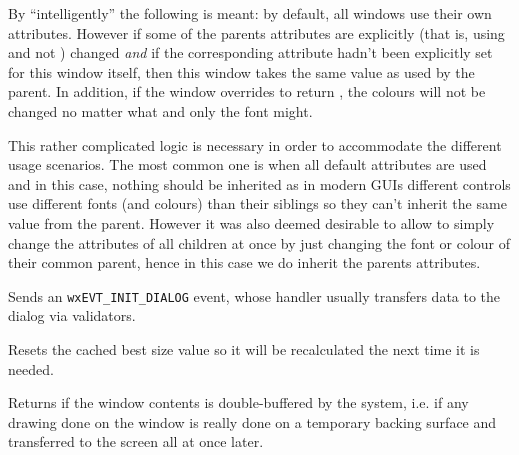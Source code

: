 By ``intelligently'' the following is meant: by default, all windows use their
own  attributes. However
if some of the parents attributes are explicitly (that is, using
 and not
) changed \emph{and} if the
corresponding attribute hadn't been explicitly set for this window itself,
then this window takes the same value as used by the parent. In addition, if
the window overrides 
to return \false, the colours will not be changed no matter what and only the
font might.

This rather complicated logic is necessary in order to accommodate the
different usage scenarios. The most common one is when all default attributes
are used and in this case, nothing should be inherited as in modern GUIs
different controls use different fonts (and colours) than their siblings so
they can't inherit the same value from the parent. However it was also deemed
desirable to allow to simply change the attributes of all children at once by
just changing the font or colour of their common parent, hence in this case we
do inherit the parents attributes.


\label{wxwindowinitdialog}


Sends an {\tt wxEVT\_INIT\_DIALOG} event, whose handler usually transfers data
to the dialog via validators.


\label{wxwindowinvalidatebestsize}


Resets the cached best size value so it will be recalculated the next time it is needed.


\label{wxwindowisdoublebuffered}


Returns \true if the window contents is double-buffered by the system, i.e. if
any drawing done on the window is really done on a temporary backing surface
and transferred to the screen all at once later.




\label{wxwindowisenabled}

